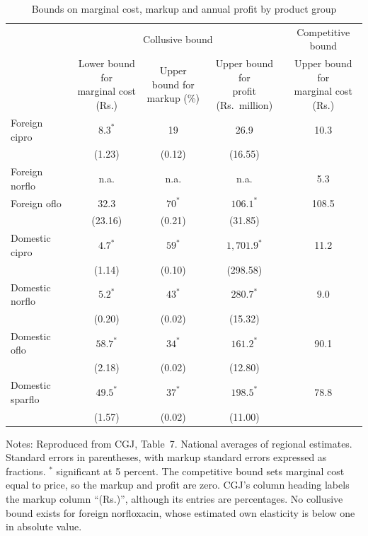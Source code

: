 \begin{table}[htbp]
\centering
\caption{Bounds on marginal cost, markup and annual profit by product group}\label{tab:05-cgj-table7}
\small
\setlength{\tabcolsep}{4pt}
\begin{tabular}{lcccc}
\toprule
 & \multicolumn{3}{c}{Collusive bound} & Competitive bound \\
\cmidrule(lr){2-4}\cmidrule(lr){5-5}
 & \makecell{Lower bound for\\ marginal cost (Rs.)} & \makecell{Upper bound for\\ markup (\%)} &
 \makecell{Upper bound for\\ profit (Rs.\ million)} & \makecell{Upper bound for\\ marginal cost (Rs.)} \\
\midrule
Foreign cipro & $8.3^{*}$ & 19 & 26.9 & 10.3 \\
 & (1.23) & (0.12) & (16.55) & \\
Foreign norflo & n.a. & n.a. & n.a. & 5.3 \\
Foreign oflo & 32.3 & $70^{*}$ & $106.1^{*}$ & 108.5 \\
 & (23.16) & (0.21) & (31.85) & \\
Domestic cipro & $4.7^{*}$ & $59^{*}$ & $1{,}701.9^{*}$ & 11.2 \\
 & (1.14) & (0.10) & (298.58) & \\
Domestic norflo & $5.2^{*}$ & $43^{*}$ & $280.7^{*}$ & 9.0 \\
 & (0.20) & (0.02) & (15.32) & \\
Domestic oflo & $58.7^{*}$ & $34^{*}$ & $161.2^{*}$ & 90.1 \\
 & (2.18) & (0.02) & (12.80) & \\
Domestic sparflo & $49.5^{*}$ & $37^{*}$ & $198.5^{*}$ & 78.8 \\
 & (1.57) & (0.02) & (11.00) & \\
\bottomrule
\end{tabular}
\par\smallskip
\begin{minipage}{0.95\textwidth}\footnotesize
Notes: Reproduced from CGJ, Table~7. National averages of regional estimates. Standard errors in parentheses, with
markup standard errors expressed as fractions. $^{*}$ significant at 5 percent. The competitive bound sets marginal
cost equal to price, so the markup and profit are zero. CGJ's column heading labels the markup column ``(Rs.)'',
although its entries are percentages. No collusive bound exists for foreign norfloxacin, whose estimated own
elasticity is below one in absolute value.
\end{minipage}
\end{table}

